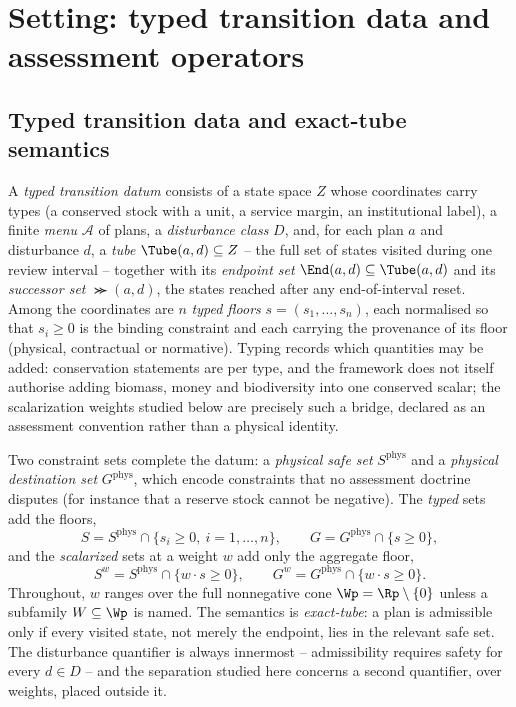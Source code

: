 \section{Setting: typed transition data and assessment operators}\label{sec:setting}

\subsection{Typed transition data and exact-tube semantics}

A \emph{typed transition datum} consists of a state space $Z$ whose coordinates carry types (a conserved stock with a unit, a service margin, an institutional label), a finite \emph{menu} $\mathcal A$ of plans, a \emph{disturbance class} $D$, and, for each plan $a$ and disturbance $d$, a \emph{tube} $\Tube(a,d)\subseteq Z$ -- the full set of states visited during one review interval -- together with its \emph{endpoint set} $\End(a,d)\subseteq\Tube(a,d)$ and its \emph{successor set} $\Succ(a,d)$, the states reached after any end-of-interval reset. Among the coordinates are $n$ \emph{typed floors} $s=(s_1,\dots,s_n)$, each normalised so that $s_i\ge0$ is the binding constraint and each carrying the provenance of its floor (physical, contractual or normative). Typing records which quantities may be added: conservation statements are per type, and the framework does not itself authorise adding biomass, money and biodiversity into one conserved scalar; the scalarization weights studied below are precisely such a bridge, declared as an assessment convention rather than a physical identity.

Two constraint sets complete the datum: a \emph{physical safe set} $S^{\mathrm{phys}}$ and a \emph{physical destination set} $G^{\mathrm{phys}}$, which encode constraints that no assessment doctrine disputes (for instance that a reserve stock cannot be negative). The \emph{typed} sets add the floors,
\[
S=S^{\mathrm{phys}}\cap\{s_i\ge0,\ i=1,\dots,n\},\qquad G=G^{\mathrm{phys}}\cap\{s\ge0\},
\]
and the \emph{scalarized} sets at a weight $w$ add only the aggregate floor,
\[
S^w=S^{\mathrm{phys}}\cap\{w\cdot s\ge0\},\qquad G^w=G^{\mathrm{phys}}\cap\{w\cdot s\ge0\}.
\]
Throughout, $w$ ranges over the full nonnegative cone $\Wp=\Rp\setminus\{0\}$ unless a subfamily $W\subseteq\Wp$ is named. The semantics is \emph{exact-tube}: a plan is admissible only if every visited state, not merely the endpoint, lies in the relevant safe set. The disturbance quantifier is always innermost -- admissibility requires safety for every $d\in D$ -- and the separation studied here concerns a second quantifier, over weights, placed outside it.

